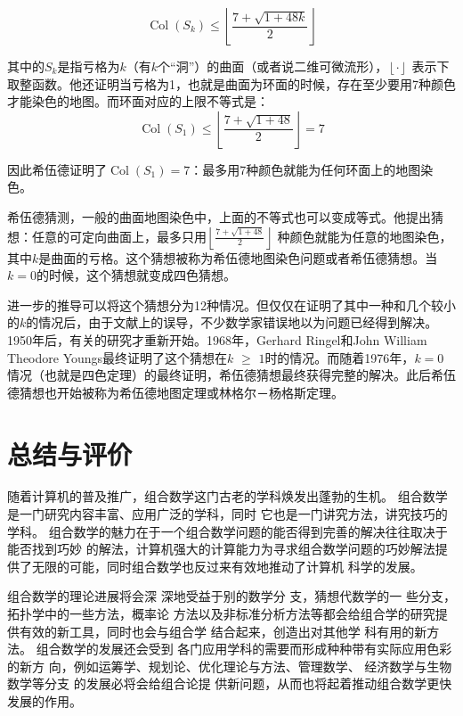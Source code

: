 \documentclass[12pt]{article} %
\begin{document}
\begin{equation}
\label{eqn:eqn1}
\operatorname{Col}\left(S_{k}\right) \leqslant\left\lfloor\frac{7+\sqrt{1+48k}}{2}\right\rfloor
\end{equation}


其中的$S_{k}$是指亏格为$k$（有$k$个“洞”）的曲面（或者说二维可微流形），$\left\lfloor \cdot \right\rfloor$ 表示下取整函数。他还证明当亏格为1，也就是曲面为环面的时候，存在至少要用7种颜色才能染色的地图。而环面对应的上限不等式是：
\begin{equation}
\label{eqn:eqn1}
\operatorname{Col}\left(S_{1}\right) \leqslant\left\lfloor\frac{7+\sqrt{1+48}}{2}\right\rfloor=7
\end{equation}

因此希伍德证明了$\operatorname {Col}(S_{1})=7$：最多用7种颜色就能为任何环面上的地图染色\cite{GAY}\cite{GR}。

希伍德猜测，一般的曲面地图染色中，上面的不等式也可以变成等式。他提出猜想：任意的可定向曲面上，最多只用$\left\lfloor\frac{7+\sqrt{1+48}}{2}\right\rfloor$ 种颜色就能为任意的地图染色，其中$k$是曲面的亏格。这个猜想被称为希伍德地图染色问题或者希伍德猜想。当$k = 0$的时候，这个猜想就变成四色猜想。

进一步的推导可以将这个猜想分为12种情况。但仅仅在证明了其中一种和几个较小的$k$的情况后，由于文献上的误导，不少数学家错误地以为问题已经得到解决。1950年后，有关的研究才重新开始。1968年，Gerhard Ringel和John William Theodore Youngs最终证明了这个猜想在$k$ $\geq$ $1$时的情况。而随着1976年，$k = 0$情况（也就是四色定理）的最终证明，希伍德猜想最终获得完整的解决。此后希伍德猜想也开始被称为希伍德地图定理或林格尔－杨格斯定理。





\section{总结与评价}
随着计算机的普及推广，组合数学这门古老的学科焕发出蓬勃的生机。 组合数学是一门研究内容丰富、应用广泛的学科，同时
它也是一门讲究方法，讲究技巧的学科。 组合数学的魅力在于一个组合数学问题的能否得到完善的解决往往取决于能否找到巧妙
的解法，计算机强大的计算能力为寻求组合数学问题的巧妙解法提供了无限的可能，同时组合数学也反过来有效地推动了计算机
科学的发展。

组合数学的理论进展将会深 深地受益于别的数学分
支，猜想代数学的一 些分支，
拓扑学中的一些方法，概率论 方法以及非标准分析方法等都会给组合学的研究提供有效的新工具，同时也会与组合学 结合起来，创造出对其他学 科有用的新方法。
组合数学的发展还会受到 各门应用学科的需要而形成种种带有实际应用色彩的新方 向，例如运筹学、规划论、优化理论与方法、管理数学、 经济数学与生物数学等分支 的发展必将会给组合论提 供新问题，从而也将起着推动组合数学更快发展的作用。
\end{document}
